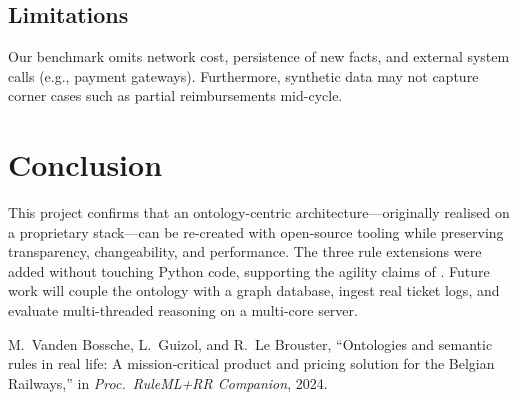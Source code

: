 \documentclass[lettersize,journal]{IEEEtran}
\begin{document}
\subsection{Limitations}
Our benchmark omits network cost, persistence of new facts, and external system calls (e.g., payment gateways).  
Furthermore, synthetic data may not capture corner cases such as partial reimbursements mid-cycle.

\section{Conclusion}
This project confirms that an ontology-centric architecture—originally realised on a proprietary stack—can be re-created with open-source tooling while preserving transparency, changeability, and performance.  
The three rule extensions were added without touching Python code, supporting the agility claims of \cite{ruleml24}.  
Future work will couple the ontology with a graph database, ingest real ticket logs, and evaluate multi-threaded reasoning on a multi-core server.


\begin{thebibliography}{1}
M.~Vanden Bossche, L.~Guizol, and R.~Le Brouster, ``Ontologies and semantic
  rules in real life: {A} mission‐critical product and pricing solution for
  the {Belgian Railways},'' in \emph{Proc.\ RuleML+RR Companion}, 2024.
\end{thebibliography}
\end{document}
